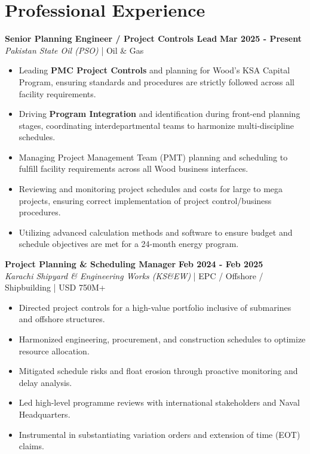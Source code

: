 \documentclass[11pt,a4paper]{article}
\begin{document}
\section{Professional Experience}
\noindent \textbf{\large Senior Planning Engineer / Project Controls Lead} \hfill \textbf{\color{awesome-blue}Mar 2025 - Present}\\
\textit{Pakistan State Oil (PSO)} | Oil \& Gas\\
\begin{itemize}
    \item Leading \textbf{PMC Project Controls} and planning for Wood’s KSA Capital Program, ensuring standards and procedures are strictly followed across all facility requirements.
    \item Driving \textbf{Program Integration} and identification during front-end planning stages, coordinating interdepartmental teams to harmonize multi-discipline schedules.
    \item Managing Project Management Team (PMT) planning and scheduling to fulfill facility requirements across all Wood business interfaces.
    \item Reviewing and monitoring project schedules and costs for large to mega projects, ensuring correct implementation of project control/business procedures.
    \item Utilizing advanced calculation methods and software to ensure budget and schedule objectives are met for a 24-month energy program.
\end{itemize}

\noindent \textbf{\large Project Planning \& Scheduling Manager} \hfill \textbf{\color{awesome-blue}Feb 2024 - Feb 2025}\\
\textit{Karachi Shipyard \& Engineering Works (KS\&EW)} | EPC / Offshore / Shipbuilding | USD 750M+\\
\begin{itemize}
    \item Directed project controls for a high-value portfolio inclusive of submarines and offshore structures.
    \item Harmonized engineering, procurement, and construction schedules to optimize resource allocation.
    \item Mitigated schedule risks and float erosion through proactive monitoring and delay analysis.
    \item Led high-level programme reviews with international stakeholders and Naval Headquarters.
    \item Instrumental in substantiating variation orders and extension of time (EOT) claims.
\end{itemize}
\end{document}

